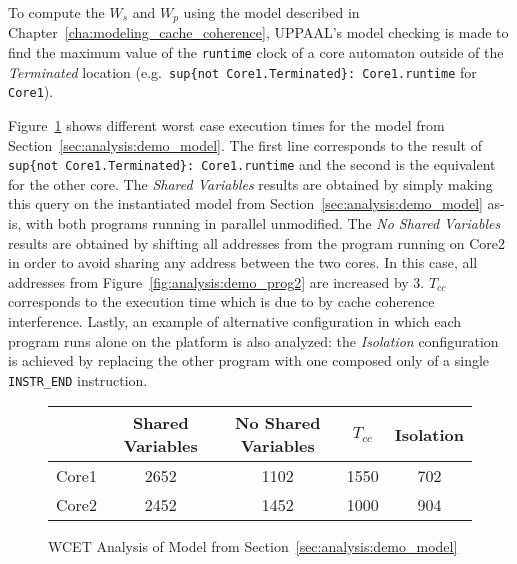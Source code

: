 To compute the $W_{s}$ and $W_{p}$ using the model described in
Chapter~\ref{cha:modeling_cache_coherence}, UPPAAL's model checking is made to
find the maximum value of the \lstinline{runtime} clock of a core automaton
outside of the \textit{Terminated} location
(e.g.~\lstinline!sup{not Core1.Terminated}: Core1.runtime! for \texttt{Core1}).

\begin{example}
Figure~\ref{fig:analysis:wcet_calc} shows different worst case execution times
for the model from Section~\ref{sec:analysis:demo_model}. The first line
corresponds to the result of \lstinline!sup{not Core1.Terminated}: Core1.runtime!
and the second is the equivalent for the other core. The \textit{Shared
Variables} results are obtained by simply making this query on the instantiated
model from Section~\ref{sec:analysis:demo_model} as-is, with both programs
running in parallel unmodified. The \textit{No Shared Variables} results are
obtained by shifting all addresses from the program running on Core2 in order
to avoid sharing any address between the two cores. In this case, all addresses
from Figure~\ref{fig:analysis:demo_prog2} are increased by $3$. $T_{cc}$
corresponds to the execution time which is due to by cache coherence
interference. Lastly, an example of alternative configuration in which each
program runs alone on the platform is also analyzed: the \textit{Isolation}
configuration is achieved by replacing the other program with one composed only
of a single \lstinline!INSTR_END! instruction.

\begin{figure}[hbt!]
\centering
\begin{tabular}{|c|c|c|c|c|}
\cline{2-5}
\multicolumn{1}{c|}{}
      & Shared Variables & No Shared Variables & $T_{cc}$ & Isolation \\
\hline
Core1 & 2652 & 1102 & 1550 & 702\\
\hline
Core2 & 2452 & 1452 & 1000 & 904\\
\hline
\end{tabular}
\caption{WCET Analysis of Model from Section~\ref{sec:analysis:demo_model}}
\label{fig:analysis:wcet_calc}
\end{figure}


\end{example}
